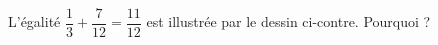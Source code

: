 
\begin{exercice}\label{exosmath-0844}

    L'égalité \( \dfrac{ 1 }{ 3 }+\dfrac{ 7 }{ 12 }=\dfrac{ 11 }{ 12 }\) est illustrée par le dessin ci-contre. Pourquoi ?

\begin{center}
   
\end{center}


\end{exercice}
